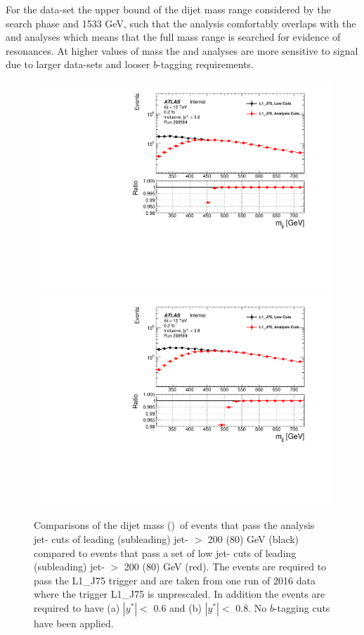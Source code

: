 For the \lm{} data-set the upper bound of the dijet mass range considered by the search phase and 1533 GeV,
such that the analysis comfortably overlaps with the \summer{} and \hm{} analyses
which means that the full mass range is searched for evidence of resonances.
At higher values of mass the \summer{} and \hm{} analyses are more sensitive to signal due to
larger data-sets and looser $b$-tagging requirements.

\begin{figure}[!ht]
  \begin{center}
    \captionsetup[subfigure]{aboveskip=0pt,justification=centering}
     {\includegraphics[width=0.5\linewidth, angle=0]{figs/Dibjet/LowMass/evt-mjj_yStar0p6.pdf}}\hspace{-2mm}
     {\includegraphics[width=0.5\linewidth, angle=0]{figs/Dibjet/LowMass/evt-mjj_yStar0p8.pdf}}
  \end{center}
  \caption{Comparisons of the dijet mass (\mjj{})~of events that pass the analysis jet-\pT{} cuts of leading (subleading) jet-\pT{} $>$ 200 (80) GeV (black)
    compared to events that pass a set of low jet-\pT{} cuts of leading (subleading) jet-\pT{} $>$ 200 (80) GeV (red).
    The events are required to pass the L1\_J75 trigger and are taken from one run of 2016 data where the trigger L1\_J75 is unprescaled.
    In addition the events are required to have (a) $|y^*| <$ 0.6 and (b) $|y^*| <$ 0.8.
    No $b$-tagging cuts have been applied.}
     \label{fig:evt-lowmass_turnon}
\end{figure}

